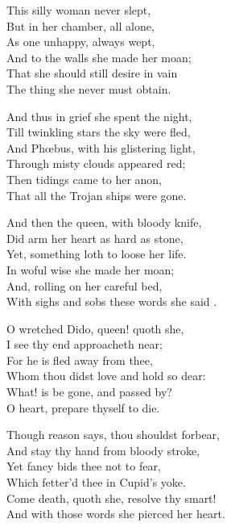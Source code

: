 \begin{dcverse}
\begin{patverse}
This silly woman never slept,\\
But in her chamber, all alone,\\
As one unhappy, always wept,\\
And to the walls she made her moan;\\
That she should still desire in vain\\
The thing she never must obtain.
\end{patverse}

\begin{patverse}
And thus in grief she spent the night,\\
Till twinkling stars the sky were fled,\\
And Phœbus, with his glistering light,\\
Through misty clouds appeared red;\\
Then tidings came to her anon,\\
That all the Trojan ships were gone.
\end{patverse}

\begin{patverse}
And then the queen, with bloody knife,\\
Did arm her heart as hard as stone,\\
Yet, something loth to loose her life.\\
In woful wise she made her moan;\\
And, rolling on her careful bed,\\
With sighs and sobs these words she said .
\end{patverse}

\begin{patverse}
O wretched Dido, queen! quoth she,\\
I see thy end approacheth near;\\
For he is fled away from thee,\\
Whom thou didst love and hold so dear:\\
What! is be gone, and passed by?\\
O heart, prepare thyself to die.
\end{patverse}

\begin{patverse}
Though reason says, thou shouldst forbear,\\
And stay thy hand from bloody stroke,\\
Yet fancy bids thee not to fear,\\
Which fetter’d thee in Cupid’s yoke.\\
Come death, quoth she, resolve thy smart!\\
And with those words she pierced her heart.
\end{patverse}
\end{dcverse}


